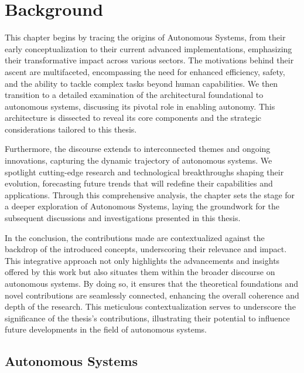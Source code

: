 \chapter{Background}
\label{background}


This chapter begins by tracing the origins of Autonomous Systems, from their early conceptualization to their current advanced implementations, emphasizing their transformative impact across various sectors. The motivations behind their ascent are multifaceted, encompassing the need for enhanced efficiency, safety, and the ability to tackle complex tasks beyond human capabilities. We then transition to a detailed examination of the architectural foundational to autonomous systems, discussing its pivotal role in enabling autonomy. This architecture is dissected to reveal its core components and the strategic considerations tailored to this thesis. 

Furthermore, the discourse extends to interconnected themes and ongoing innovations, capturing the dynamic trajectory of autonomous systems. We spotlight cutting-edge research and technological breakthroughs shaping their evolution, forecasting future trends that will redefine their capabilities and applications. Through this comprehensive analysis, the chapter sets the stage for a deeper exploration of Autonomous Systems, laying the groundwork for the subsequent discussions and investigations presented in this thesis. 

In the conclusion, the contributions made are contextualized against the backdrop of the introduced concepts, underscoring their relevance and impact. This integrative approach not only highlights the advancements and insights offered by this work but also situates them within the broader discourse on autonomous systems. By doing so, it ensures that the theoretical foundations and novel contributions are seamlessly connected, enhancing the overall coherence and depth of the research. This meticulous contextualization serves to underscore the significance of the thesis's contributions, illustrating their potential to influence future developments in the field of autonomous systems.





\newpage

\section{Autonomous Systems}



